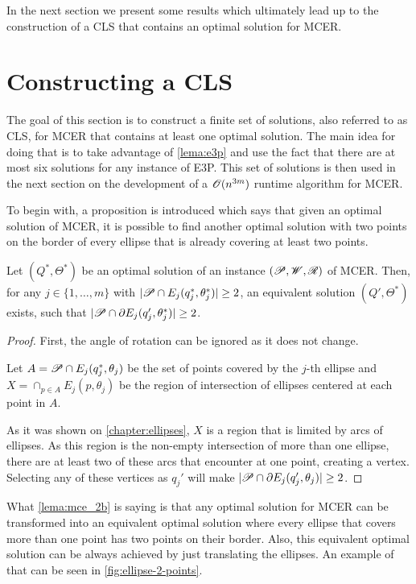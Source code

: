 In the next section we present some results which ultimately lead up to the construction of a CLS that contains an optimal solution for MCER.

\section{Constructing a CLS}

The goal of this section is to construct a finite set of solutions, also referred to as CLS, for MCER that contains at least one optimal solution.
The main idea for doing that is to take advantage of \autoref{lema:e3p} and use the fact that there are at most six solutions for any instance of E3P.
This set of solutions is then used in the next section on the development of a $\mathscr{O}(n^{3m})$ runtime algorithm for MCER.

To begin with, a proposition is introduced which says that given an optimal solution of MCER, it is possible to find another optimal solution with two points on the border of every ellipse that is already covering at least two points.

\begin{proposicao}\label{lema:mce_2b}
	Let $(Q^*, \Theta^*)$ be an optimal solution of an instance $(\mathscr{P}, \mathscr{W}, \mathscr{R})$ of MCER. 
	Then, for any $j\in\{1, \dots, m\}$ with $|\mathscr{P} \cap E_j(q_j^*, \theta_j^*)|\ge2$, 
	an equivalent solution $(Q', \Theta^*)$ exists, such that $|\mathscr{P} \cap \partial E_j(q_j', \theta_j^*)|\ge 2$.
\end{proposicao}

\begin{proof}
	First, the angle of rotation can be ignored as it does not change.
	
	Let $A=\mathscr{P} \cap E_j(q_j^*, \theta_j)$ be the set of points covered by the $j$-th ellipse and $X=\cap_{p \in A}E_j(p, \theta_j)$ be the region of intersection of ellipses centered at each point in $A$.

	As it was shown on \autoref{chapter:ellipses}, $X$ is a region that is limited by arcs of ellipses. As this region is the non-empty intersection of more than one ellipse, there are at least two of these arcs that encounter at one point, creating a vertex. Selecting any of these vertices as $q_j'$ will make $|\mathscr{P} \cap \partial E_j(q_j', \theta_j)| \ge 2$.
	
\end{proof}

What \autoref{lema:mce_2b} is saying is that any optimal solution for MCER can be transformed into an equivalent optimal solution where every ellipse that covers more than one point has two points on their border. Also, this equivalent optimal solution can be always achieved by just translating the ellipses. An example of that can be seen in \autoref{fig:ellipse-2-points}. 


